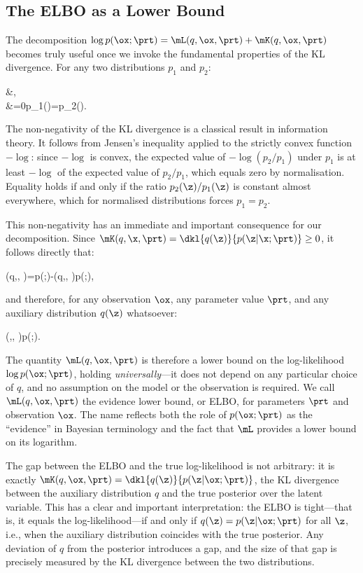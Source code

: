\subsection*{The ELBO as a Lower Bound}

The decomposition $\log p(\ox;\prt) = \mL(q,\ox,\prt) + \mK(q,\ox,\prt)$ becomes truly
useful once we invoke the fundamental properties of the KL divergence. For any two
distributions $p_1$ and $p_2$:
\begin{myalign}
	&,\\
	&=0\quad{}\quad p_1(\z)=p_2(\z)\quad{}\z.
\end{myalign}
The non-negativity of the KL divergence is a classical result in information theory. It
follows from Jensen's inequality applied to the strictly convex function $-\log$: since
$-\log$ is convex, the expected value of $-\log(p_2/p_1)$ under $p_1$ is at least $-\log$
of the expected value of $p_2/p_1$, which equals zero by normalisation. Equality holds if
and only if the ratio $p_2(\z)/p_1(\z)$ is constant almost everywhere, which for normalised
distributions forces $p_1 = p_2$.

This non-negativity has an immediate and important consequence for our decomposition.
Since $\mK(q,\x,\prt) = \dkl{q(\z)}{p(\z|\x;\prt)} \geq 0$, it follows directly that:
\begin{myequation}
\mL(q,\x, \prt)=\log p(\x ;\prt)-\mK(q,\x, \prt)\leq\log p(\x ;\prt),
\end{myequation}
and therefore, for any observation $\ox$, any parameter value $\prt$, and any auxiliary
distribution $q(\z)$ whatsoever:
\begin{myequation}
\mL(\fq,\x, \prt)\leq\log p(\x;\prt)\hspace{1cm}\fq.
\end{myequation}
The quantity $\mL(q,\ox,\prt)$ is therefore a lower bound on the log-likelihood
$\log p(\ox;\prt)$, holding \emph{universally}---it does not depend on any particular choice
of $q$, and no assumption on the model or the observation is required. We call
$\mL(q,\ox,\prt)$ the \alert{evidence lower bound}, or \alert{ELBO}, for parameters $\prt$
and observation $\ox$. The name reflects both the role of $p(\ox;\prt)$ as the ``evidence''
in Bayesian terminology and the fact that $\mL$ provides a lower bound on its logarithm.

The gap between the ELBO and the true log-likelihood is not arbitrary: it is exactly
$\mK(q,\ox,\prt) = \dkl{q(\z)}{p(\z|\ox;\prt)}$, the KL divergence between the auxiliary
distribution $q$ and the true posterior over the latent variable. This has a clear and
important interpretation: the ELBO is tight---that is, it equals the log-likelihood---if and
only if $q(\z) = p(\z|\ox;\prt)$ for all $\z$, i.e., when the auxiliary distribution coincides
with the true posterior. Any deviation of $q$ from the posterior introduces a gap, and the
size of that gap is precisely measured by the KL divergence between the two distributions.

